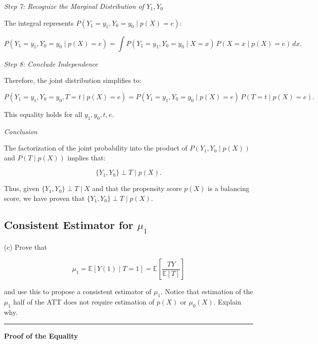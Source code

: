 \documentclass{article}
\newenvironment{colorparagraph}[1]{\par\color{#1}}{\par}
\begin{document}
\textit{Step 7: Recognize the Marginal Distribution of \( Y_1, Y_0 \)}

The integral represents \( P(Y_1 = y_1, Y_0 = y_0 \mid p(X) = e) \):

\[
P(Y_1 = y_1, Y_0 = y_0 \mid p(X) = e) = \int P(Y_1 = y_1, Y_0 = y_0 \mid X = x) \, P(X = x \mid p(X) = e) \, dx.
\]

\textit{Step 8: Conclude Independence}

Therefore, the joint distribution simplifies to:

\[
P(Y_1 = y_1, Y_0 = y_0, T = t \mid p(X) = e) = P(Y_1 = y_1, Y_0 = y_0 \mid p(X) = e) \, P(T = t \mid p(X) = e).
\]

This equality holds for all \( y_1, y_0, t, e \).

\textit{Conclusion}

The factorization of the joint probability into the product of \( P(Y_1, Y_0 \mid p(X)) \) and \( P(T \mid p(X)) \) implies that:

\[
\{Y_1, Y_0\} \perp T \mid p(X).
\]

Thus, given \( \{Y_1, Y_0\} \perp T \mid X \) and that the propensity score \( p(X) \) is a balancing score, we have proven that \( \{Y_1, Y_0\} \perp T \mid p(X) \).

\begin{colorparagraph}{questioncolor}
\label{q2c}\subsection{Consistent Estimator for \( \mu_1 \)}
(c) Prove that 

\[
\mu_1 = \mathbb{E}[Y(1) \mid T = 1] = \mathbb{E} \left[ \frac{TY}{\mathbb{E}[T]} \right]
\]

and use this to propose a consistent estimator of \( \mu_1 \). Notice that estimation of the \( \mu_1 \) half of the ATT does not require estimation of \( p(X) \) or \( \mu_0(X) \). Explain why.

\rule{\textwidth}{0.5pt}
\end{colorparagraph}

\textbf{Proof of the Equality}

We aim to prove that:
\[
\mu_1 = \mathbb{E}[Y(1) \mid T = 1] = \mathbb{E}\left[ \frac{T Y}{\mathbb{E}[T]} \right].
\]

\textit{Step 1: Express \(\mu_1\) Using the Law of Iterated Expectations}

By definition, \(\mu_1\) is the expected potential outcome under treatment for treated individuals:
\[
\mu_1 = \mathbb{E}[Y(1) \mid T = 1].
\]
\end{document}
